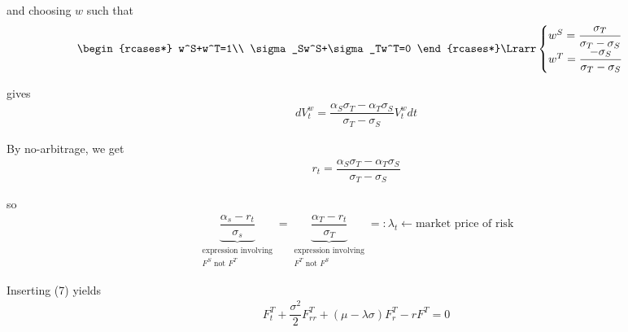 \noindent and choosing $w$ such that
\begin{equation*}
  \begin{gathered}
    \begin{rcases*}
      w^S+w^T=1\\
      \sigma_Sw^S+\sigma_Tw^T=0
    \end{rcases*}\Lrarr
    \begin{cases}
      w^S = \dfrac{\sigma_T}{\sigma_T-\sigma_S}\\
      w^T =\dfrac{-\sigma_S}{\sigma_T-\sigma_S}
    \end{cases}
  \end{gathered}
\end{equation*}\par
\noindent gives
\begin{equation*}
  \begin{gathered}
    dV_t^w = \dfrac{\alpha_S\sigma_T-\alpha_T\sigma_S}{\sigma_T-\sigma_S}V_t^wdt
  \end{gathered}
\end{equation*}\par
\noindent By no-arbitrage, we get
\begin{equation*}
  \begin{gathered}
    r_t = \dfrac{\alpha_S\sigma_T-\alpha_T\sigma_S}{\sigma_T-\sigma_S}
  \end{gathered}
\end{equation*}\par
\noindent so
\begin{equation*}
  \begin{gathered}
    \underbrace{\dfrac{\alpha_s-r_t}{\sigma_s}}_{\substack{\text{expression involving}\\F^S\text{ not } F^T}} = \underbrace{\dfrac{\alpha_T-r_t}{\sigma_T}}_{\substack{\text{expression involving}\\F^T\text{ not }F^S}} =:\lambda_t\leftarrow\text{market price of risk}
  \end{gathered}
\end{equation*}\par
\noindent Inserting (7) yields
\begin{equation*}
  \begin{gathered}
    F_t^T+\dfrac{\sigma^2}{2}F_{rr}^T+(\mu-\lambda \sigma)F_r^T-rF^T=0
  \end{gathered}
\end{equation*}
\par\bigskip

